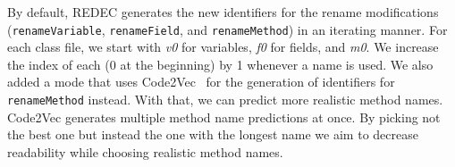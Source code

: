 \documentclass[%
class=scrreprt,
chapterprefix=false,%
open=right,%
twoside=true,%
paper=a4,%
logofile={Logo\_zentral\_farbig\_EN.png},%
thesistype=master,%
UKenglish,%
]{se2thesis}
\theoremstyle{definition}
\newcommand{\rdh}{REDEC\xspace}
\begin{document}
	By default, \rdh generates the new identifiers for the rename modifications (\texttt{renameVariable}, \texttt{renameField}, and \texttt{renameMethod}) in an iterating manner. For each class file, we start with \textit{v0} for variables, \textit{f0} for fields, and \textit{m0}. We increase the index of each (0 at the beginning) by 1 whenever a name is used.
	We also added a mode that uses Code2Vec~\cite{alon2019code2vec} for the generation of identifiers for \texttt{renameMethod} instead. With that, we can predict more realistic method names. Code2Vec generates multiple method name predictions at once. By picking not the best one but instead the one with the longest name we aim to decrease readability while choosing realistic method names.
		
	
\end{document}
